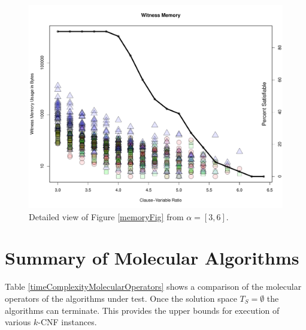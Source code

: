\begin{figure}[htdp]
\begin{center}

\includegraphics[width=1.1\textwidth]{./figures/plotImage/memory3-6_2.pdf}

\caption{Detailed view of Figure \ref{memoryFig} from $\alpha = [3,6]$. }
\label{memoryFigDetail}
\end{center}
\end{figure}


\FloatBarrier

	\section{Summary of Molecular Algorithms}

		Table \ref{timeComplexityMolecularOperators} shows a comparison of the molecular operators of the algorithms under test.  Once the solution space $T_S = \emptyset$ the algorithms can terminate.  This provides the upper bounds for execution of various $k$-CNF instances.  
		
